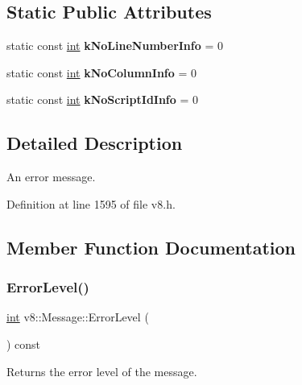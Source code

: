 \subsection*{Static Public Attributes}
\begin{DoxyCompactItemize}
\item 
\mbox{\label{classv8_1_1Message_a35649a6c0c813ba82c9886a2b17da124}} 
static const \mbox{\hyperlink{classint}{int}} {\bfseries k\+No\+Line\+Number\+Info} = 0
\item 
\mbox{\label{classv8_1_1Message_a8cb643dbf408b0fd2526b23a8202c4a6}} 
static const \mbox{\hyperlink{classint}{int}} {\bfseries k\+No\+Column\+Info} = 0
\item 
\mbox{\label{classv8_1_1Message_a5aac643173466e88544cb1daa74553d6}} 
static const \mbox{\hyperlink{classint}{int}} {\bfseries k\+No\+Script\+Id\+Info} = 0
\end{DoxyCompactItemize}


\subsection{Detailed Description}
An error message. 

Definition at line 1595 of file v8.\+h.



\subsection{Member Function Documentation}
\mbox{\label{classv8_1_1Message_a91bb679f695d82c2c2228645ca4497c6}} 
\subsubsection{\texorpdfstring{Error\+Level()}{ErrorLevel()}}
{\footnotesize\ttfamily \mbox{\hyperlink{classint}{int}} v8\+::\+Message\+::\+Error\+Level (\begin{DoxyParamCaption}{ }\end{DoxyParamCaption}) const}

Returns the error level of the message. 

